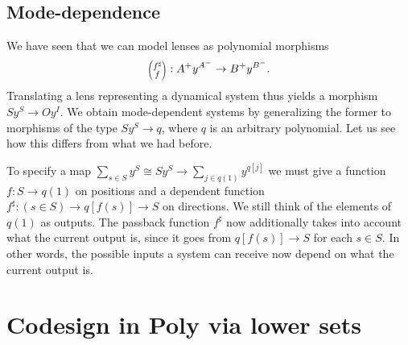 \documentclass[12pt, a4paper]{article}
\theoremstyle{definition}
\theoremstyle{plain}
\theoremstyle{plain}
\theoremstyle{plain}
\theoremstyle{plain}
\theoremstyle{plain}
\theoremstyle{remark}
\theoremstyle{remark}
\newcommand{\lens}[2]{\scaleobj{0.6}{\begin{pmatrix} \scaleobj{1.3}{{#1}} \\ \scaleobj{1.3}{{#2}} \end{pmatrix}}}
\begin{document}
\subsection{Mode-dependence}
We have seen that we can model lenses as polynomial morphisms 
$$\lens{f^\sharp}{f} :A^+ y^{A^-} \rightarrow B^+ y^{B^-} .$$
Translating a lens representing a dynamical system thus yields a morphism
$S y^S \rightarrow O y^I$. We obtain mode-dependent systems by generalizing the former to morphisms of the type $S y^S \rightarrow q$, where $q$ is an arbitrary polynomial. Let us see how this differs from what we had before.

To specify a map $\sum_{s \in S} y^S \cong S y^S \rightarrow \sum_{j \in q(1)} y^{q[j]}$ we must give a function $f: S \rightarrow q(1)$ on positions and a dependent function $f^\sharp: (s \in S) \rightarrow q[f(s)] \rightarrow S$ on directions. We still think of the elements of $q(1)$ as outputs. The passback function $f^\sharp$ now additionally takes into account what the current output is, since it goes from $q[f(s)] \rightarrow S$ for each $s \in S$. In other words, the possible inputs a system can receive now depend on what the current output is.

\section{Codesign in \textsf{Poly} via lower sets}
\end{document}
